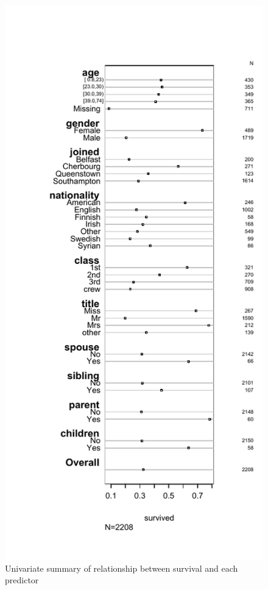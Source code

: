 \documentclass[]{interact}
\theoremstyle{plain}%
\theoremstyle{definition}
\theoremstyle{remark}
\begin{document}
\begin{figure}

{\centering \includegraphics{titanic-survival_files/figure-latex/univariate-1} 

}

\caption{Univariate summary of relationship between survival and each predictor}\label{fig:univariate}
\end{figure}
\end{document}
